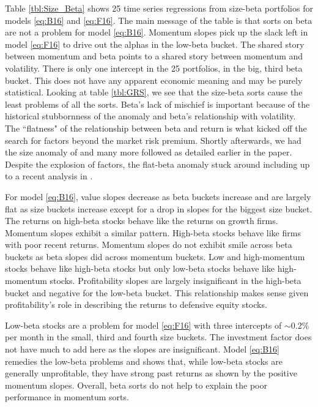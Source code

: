 
Table \ref{tbl:Size_Beta} shows 25 time series regressions from size-beta
portfolios for models \ref{eq:B16} and \ref{eq:F16}. The main message of the
table is that sorts on beta are not a problem for model \ref{eq:B16}. Momentum
slopes pick up the slack left in model \ref{eq:F16} to drive out the alphas in
the low-beta bucket. The shared story between momentum and beta points to a
shared story between momentum and volatility. There is only one intercept in
the 25 portfolios, in the big, third beta bucket. This does not have any
apparent economic meaning and may be purely statistical. Looking at table
\ref{tbl:GRS}, we see that the size-beta sorts cause the least problems of all
the sorts. Beta's lack of mischief is important because of the historical
stubbornness of the anomaly and beta's relationship with volatility. The
``flatness" of the relationship between beta and return
\parencite{jensen1972capital} is what kicked off the search for factors beyond
the market risk premium. Shortly afterwards, we had the size anomaly of
\textcite{banz1981relationship} and many more followed as detailed earlier in
the paper. Despite the explosion of factors, the flat-beta anomaly stuck around
including up to a recent analysis in \textcite{fama2016dissecting}.

For model \ref{eq:B16}, value slopes decrease as beta buckets increase and are
largely flat as size buckets increase except for a drop in slopes for the
biggest size bucket.
The returns on high-beta stocks behave like the returns on growth firms.
Momentum slopes exhibit a similar pattern.
High-beta stocks behave like firms with poor recent returns.
Momentum slopes do not exhibit smile across beta buckets as beta slopes did
across momentum buckets.
Low and high-momentum stocks behave like high-beta stocks but only low-beta
stocks behave like high-momentum stocks.
Profitability slopes are largely insignificant in the high-beta bucket and
negative for the low-beta bucket.
This relationship makes sense given profitability's role in describing the
returns to defensive equity stocks.

Low-beta stocks are a problem for model \ref{eq:F16} with three intercepts of
$\sim$0.2\% per month in the small, third and fourth size buckets.
The investment factor does not have much to add here as the slopes are
insignificant.
Model \ref{eq:B16} remedies the low-beta problems and shows that, while
low-beta stocks are generally unprofitable, they have strong past returns as
shown by the positive momentum slopes.
Overall, beta sorts do not help to explain the poor performance in momentum
sorts.
